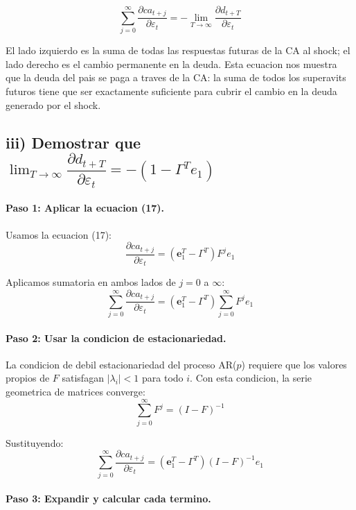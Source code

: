 \[
    \sum_{j=0}^{\infty} \frac{\partial ca_{t+j}}{\partial \varepsilon_t}
    = -\lim_{T \to \infty} \frac{\partial d_{t+T}}{\partial \varepsilon_t}
\]

\begin{interpretacion}
El lado izquierdo es la suma de todas las respuestas futuras de la CA al shock; el lado derecho es el cambio permanente en la deuda. Esta ecuacion nos muestra que la deuda del pais se paga a traves de la CA: la suma de todos los superavits futuros tiene que ser exactamente suficiente para cubrir el cambio en la deuda generado por el shock.
\end{interpretacion}

\subsection*{iii) Demostrar que $\displaystyle\lim_{T\to\infty} \dfrac{\partial d_{t+T}}{\partial \varepsilon_t} = -(1 - \Gamma^T e_1)$}

\paragraph{Paso 1: Aplicar la ecuacion (17).}

Usamos la ecuacion (17):
\[
    \frac{\partial ca_{t+j}}{\partial \varepsilon_t} = (\mathbf{e}_1^T - \Gamma^T) F^j e_1
\]

Aplicamos sumatoria en ambos lados de $j=0$ a $\infty$:
\[
    \sum_{j=0}^{\infty} \frac{\partial ca_{t+j}}{\partial \varepsilon_t}
    = (\mathbf{e}_1^T - \Gamma^T) \sum_{j=0}^{\infty} F^j e_1
\]

\paragraph{Paso 2: Usar la condicion de estacionariedad.}

La condicion de debil estacionariedad del proceso AR($p$) requiere que los valores propios de $F$ satisfagan $|\lambda_i| < 1$ para todo $i$. Con esta condicion, la serie geometrica de matrices converge:
\[
    \sum_{j=0}^{\infty} F^j = (I - F)^{-1}
\]

Sustituyendo:
\[
    \sum_{j=0}^{\infty} \frac{\partial ca_{t+j}}{\partial \varepsilon_t}
    = (\mathbf{e}_1^T - \Gamma^T)(I - F)^{-1} e_1
\]

\paragraph{Paso 3: Expandir y calcular cada termino.}

